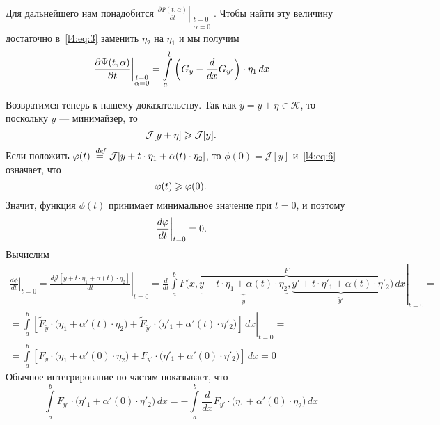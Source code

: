 \documentclass[12pt,a4paper,openany,fleqn]{book}
\newcommand {\defeq}{\stackrel{\hspace{0.09 cm}de\!f}{=}}
\newcommand {\eqdef}{\defeq}
\newcommand{\J}{\ensuremath{\mathcal{J}}}
\newcommand{\mc}[1]{\ensuremath{\mathcal{#1}}}
\newcommand{\der}[2]{\ensuremath{\frac{d#1}{d#2}}}
\newcommand{\pder}[2]{\ensuremath{\frac{\partial#1}{\partial#2}}}
\newcommand{\K}{\mc{K}}
\theoremstyle{definition}
\begin{document}
Для дальнейшего нам понадобится $\displaystyle\left.\pder{\Psi(t,\alpha)}{t}\right|_{\substack{t=0\\\alpha=0}}$. Чтобы найти эту величину достаточно в~\eqref{l4:eq:3} заменить $\eta_2$ на $\eta_1$ и мы получим 
\begin{equation}
	\label{l4:eq:5}
	\hfill\left.\pder{\Psi(t,\alpha)}{t}\right|_{\substack{t=0\\\alpha=0}}=\int\limits_a^b\left(G_y-\der{}{x}G_{y'}\right)\cdot\eta_1\,dx\hfill
\end{equation}

Возвратимся теперь к нашему доказательству. Так как $\tilde{y}=y+\eta\in\K$, то поскольку $y$ --- минимайзер, то 
\begin{equation}
	\label{l4:eq:6}
	\hfill\J[y+\eta]\geqslant\J[y].\hfill
\end{equation} 
Если положить $\phi(t)\eqdef\J[y+t\cdot\eta_1+\alpha(t)\cdot\eta_2]$, то $\phi(0)=\J[y]$ и~\eqref{l4:eq:6} означает, что 
\begin{equation}
	\label{l4:eq:7}
	\hfill\phi(t)\geqslant\phi(0).\hfill
\end{equation} 
Значит, функция $\phi(t)$ принимает минимальное значение при $t=0$, и поэтому 
\begin{equation}
	\label{l4:eq:8}
	\hfill\left.\der{\phi}{t}\right|_{t=0}=0.\hfill
\end{equation} 
Вычислим
\begin{multline}
	\label{l4:eq:9}
	\left.\der{\phi}{t}\right|_{t=0}=\left.\der{\J[y+t\cdot\eta_1+\alpha(t)\cdot\eta_2]}{t}\right|_{t=0}=\left.\der{}{t}\int\limits_a^b \overbrace{F\big(x,\underbrace{y+t\cdot\eta_1+\alpha(t)\cdot\eta_2}_{\tilde{y}},\underbrace{y'+t\cdot\eta'_1+\alpha(t)\cdot\eta'_2}_{\tilde{y}'}\big)}^{\widetilde{F}}\,dx\right|_{t=0}=\\
	=\left.\int\limits_a^b\left[\widetilde{F}_{\tilde{y}}\cdot\big(\eta_1+\alpha'(t)\cdot\eta_2\big)+\widetilde{F}_{\tilde{y}'}\cdot\big(\eta'_1+\alpha'(t)\cdot\eta'_2\big)\right]\,dx\right|_{t=0}=\\
	=\int\limits_a^b\left[{F}_{{y}}\cdot\big(\eta_1+\alpha'(0)\cdot\eta_2\big)+{F}_{y'}\cdot\big(\eta'_1+\alpha'(0)\cdot\eta'_2\big)\right]\,dx=0
\end{multline}
Обычное интегрирование по частям показывает, что
\begin{equation}
	\label{l4:eq:10}
	\int\limits_a^b F_{y'}\cdot\big(\eta'_1+\alpha'(0)\cdot\eta'_2\big)\,dx=-\int\limits_a^b\der{}{x}F_{y'}\cdot\big(\eta_1+\alpha'(0)\cdot\eta_2\big)\,dx
\end{equation}
\end{document}
